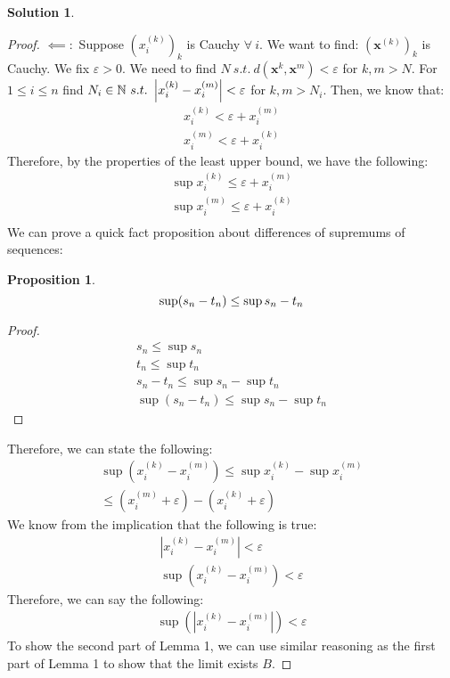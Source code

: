 \documentclass[12pt]{article}
\theoremstyle{definition} %
\newtheorem{solution}{Solution}
\newtheorem*{proposition}{Proposition}
\theoremstyle{plain} %
\begin{document}
\begin{solution}
\begin{proof}
        \(\impliedby :\) Suppose \((x_{i}^{(k)})_{k}\) is Cauchy \(\forall \ i\). We want to find: \((\mathbf{x}^{(k)})_{k}\) is Cauchy. We fix \(\varepsilon >0\). We need to find \(N\ s.t. \ d(\mathbf{x}^{k}, \mathbf{x}^{m})<\varepsilon \) for \(k, m>N\). For \(1\leq i\leq n\) find \(N_{i} \in \mathbb{\MakeUppercase{n}} \ s.t. \ \left\vert x_{i}^{(k)}- x_{i}^{(m)} \right\vert < \varepsilon\) for \(k,m>N_{i} \). Then, we know that:
        \begin{align}
            x_{i}^{(k)} <\varepsilon + x_{i}^{(m)} \\[10pt] 
            x_{i}^{(m)} < \varepsilon + x_{i}^{(k)} 
        \end{align}
        Therefore, by the properties of the least upper bound, we have the following:
        \begin{align}
          \sup x_{i}^{(k)} \leq \varepsilon + x_{i}^{(m)}\\[10pt] 
          \sup x_{i}^{(m)} \leq \varepsilon + x_{i}^{(k)}\\[10pt] 
        \end{align}
        We can prove a quick fact proposition about differences of supremums of sequences:
        \begin{proposition}
       \[ 
          \sup (s_{n} -t_{n} )\leq \sup s_{n} - t_{n} \\[10pt]  
       \] 
        \end{proposition}
        \begin{proof}
            \begin{align}
                s_{n} \leq \sup s_{n} \\[10pt] 
                t_{n} \leq \sup t_{n} \\[10pt] 
                s_{n} - t_{n} \leq \sup s_{n} -\sup t_{n} \\[10pt] 
                \sup (s_{n} -t_{n} ) \leq \sup s_{n} -\sup t_{n} 
            \end{align}
        \end{proof}
        Therefore, we can state the following:
        \begin{align}
            \sup (x_{i}^{(k)} -x_{i}^{(m)})\leq \sup x_{i}^{(k)}-\sup x_{i}^{(m)}\\[10pt] 
            \leq (x_{i}^{(m)} +\varepsilon )-(x_{i}^{(k)} +\varepsilon )
        \end{align}
        We know from the implication that the following is true:
        \begin{align} 
            \left\vert x_{i}^{(k)}- x_{i}^{(m)} \right\vert< \varepsilon \\[10pt] 
            \sup (x_{i}^{(k)}-x_{i}^{(m)}    )<\varepsilon 
        \end{align}
        Therefore, we can say the following:
        \begin{align} 
            \sup \left(  \left\vert x_{i}^{(k)}-x_{i}^{(m)} \right\vert\right)      <\varepsilon 
        \end{align}
        To show the second part of Lemma 1, we can use similar reasoning as the first part of Lemma 1 to show that the limit exists \(B\).  
    \end{proof}
\end{solution}
\end{document}
